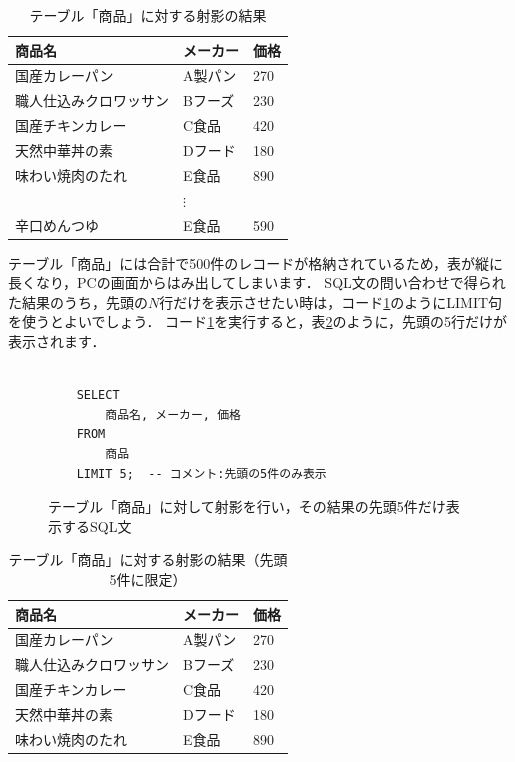 \begin{table}[!htbp]
    \centering
    \caption{テーブル「商品」に対する射影の結果}
    \begin{tabular}{@{}lll@{}}
    \toprule
    \textbf{商品名} & \textbf{メーカー} & \textbf{価格} \\ \midrule
    国産カレーパン & A製パン & 270 \\
    職人仕込みクロワッサン & Bフーズ & 230 \\
    国産チキンカレー & C食品 & 420 \\
    天然中華丼の素 & Dフード & 180 \\
    味わい焼肉のたれ & E食品 & 890 \\
    &   $\vdots$      &      \\
    辛口めんつゆ & E食品 & 590  \\ \bottomrule
    \end{tabular}
    \label{tb:sql-select}
\end{table}

テーブル「商品」には合計で500件のレコードが格納されているため，表が縦に長くなり，PCの画面からはみ出してしまいます．
SQL文の問い合わせで得られた結果のうち，先頭の$N$行だけを表示させたい時は，コード\ref{code:sql-select2}のようにLIMIT句を使うとよいでしょう．
コード\ref{code:sql-select2}を実行すると，表\ref{tb:sql-select2}のように，先頭の5行だけが表示されます．
\begin{figure}[!htbp]
    \begin{verbatim}

    SELECT
        商品名, メーカー, 価格
    FROM
        商品
    LIMIT 5;  -- コメント:先頭の5件のみ表示

    \end{verbatim}
    \captionsetup{name=コード}
    \caption{テーブル「商品」に対して射影を行い，その結果の先頭5件だけ表示するSQL文}
    \label{code:sql-select2}
\end{figure}
\begin{table}[!htbp]
    \centering
    \caption{テーブル「商品」に対する射影の結果（先頭5件に限定）}
    \begin{tabular}{@{}lll@{}}
    \toprule
    \textbf{商品名} & \textbf{メーカー} & \textbf{価格} \\ \midrule
    国産カレーパン & A製パン & 270 \\
    職人仕込みクロワッサン & Bフーズ & 230 \\
    国産チキンカレー & C食品 & 420 \\
    天然中華丼の素 & Dフード & 180 \\
    味わい焼肉のたれ & E食品 & 890 \\ \bottomrule
    \end{tabular}
    \label{tb:sql-select2}
\end{table}

